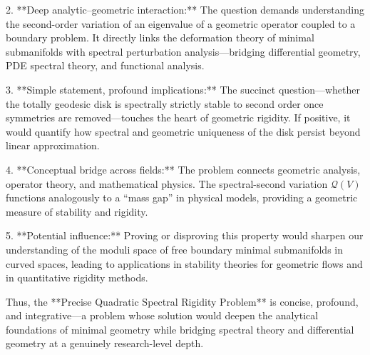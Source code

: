 2. **Deep analytic–geometric interaction:**  
   The question demands understanding the second-order variation of an eigenvalue of a geometric operator coupled to a boundary problem. It directly links the deformation theory of minimal submanifolds with spectral perturbation analysis—bridging differential geometry, PDE spectral theory, and functional analysis.

3. **Simple statement, profound implications:**  
   The succinct question—whether the totally geodesic disk is spectrally strictly stable to second order once symmetries are removed—touches the heart of geometric rigidity. If positive, it would quantify how spectral and geometric uniqueness of the disk persist beyond linear approximation.

4. **Conceptual bridge across fields:**  
   The problem connects geometric analysis, operator theory, and mathematical physics. The spectral-second variation \(\mathcal{Q}(V)\) functions analogously to a “mass gap” in physical models, providing a geometric measure of stability and rigidity.

5. **Potential influence:**  
   Proving or disproving this property would sharpen our understanding of the moduli space of free boundary minimal submanifolds in curved spaces, leading to applications in stability theories for geometric flows and in quantitative rigidity methods.

Thus, the **Precise Quadratic Spectral Rigidity Problem** is concise, profound, and integrative—a problem whose solution would deepen the analytical foundations of minimal geometry while bridging spectral theory and differential geometry at a genuinely research-level depth.